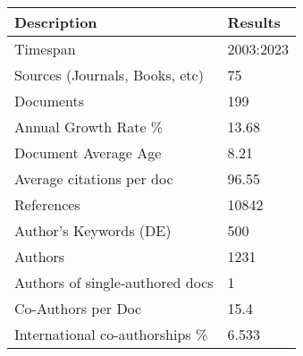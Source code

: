 
\begin{tabular}{ll}
\toprule
Description & Results\\
\midrule
Timespan & 2003:2023\\
Sources (Journals, Books, etc) & 75\\
Documents & 199\\
Annual Growth Rate \% & 13.68\\
Document Average Age & 8.21\\
\addlinespace
Average citations per doc & 96.55\\
References & 10842\\
Author's Keywords (DE) & 500\\
Authors & 1231\\
Authors of single-authored docs & 1\\
\addlinespace
Co-Authors per Doc & 15.4\\
International co-authorships \% & 6.533\\
\bottomrule
\end{tabular}